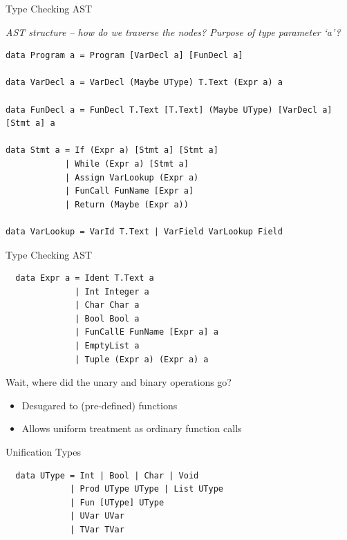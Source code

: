 \documentclass[dvipsnames,aspectratio=169]{beamer}
\begin{document}
\begin{frame}[fragile]{Type Checking AST}

  \emph{AST structure -- how do we traverse the nodes?
  Purpose of type parameter `a'?}
  \begin{verbatim}
data Program a = Program [VarDecl a] [FunDecl a]

data VarDecl a = VarDecl (Maybe UType) T.Text (Expr a) a

data FunDecl a = FunDecl T.Text [T.Text] (Maybe UType) [VarDecl a] [Stmt a] a

data Stmt a = If (Expr a) [Stmt a] [Stmt a]
            | While (Expr a) [Stmt a]
            | Assign VarLookup (Expr a)
            | FunCall FunName [Expr a]
            | Return (Maybe (Expr a))

data VarLookup = VarId T.Text | VarField VarLookup Field

\end{verbatim}

\end{frame}


\begin{frame}[fragile]{Type Checking AST}

  \begin{verbatim}
  data Expr a = Ident T.Text a
              | Int Integer a
              | Char Char a
              | Bool Bool a
              | FunCallE FunName [Expr a] a
              | EmptyList a
              | Tuple (Expr a) (Expr a) a
  \end{verbatim}

  Wait, where did the unary and binary operations go?\vspace*{-2mm}
  \begin{itemize}
    \item Desugared to (pre-defined) functions
    \item Allows uniform treatment as ordinary function calls
  \end{itemize}


\end{frame}


\begin{frame}[fragile]{Unification Types}

  \begin{verbatim}
  data UType = Int | Bool | Char | Void
             | Prod UType UType | List UType
             | Fun [UType] UType
             | UVar UVar
             | TVar TVar
  \end{verbatim}

\end{frame}
\end{document}
